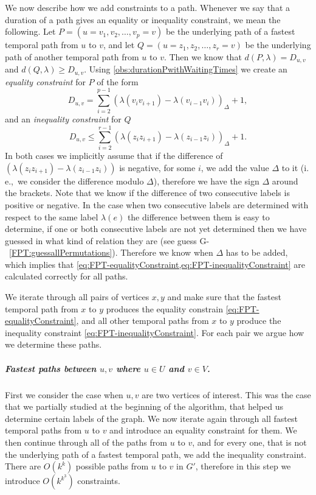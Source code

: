 \documentclass[a4paper,UKenglish,cleveref, autoref, thm-restate]{lipics-v2021}
\newcommand{\ie}{i.\,e.,\ }
\begin{document}
We now describe how we add constraints to a path. Whenever we say that a duration of a path gives an equality or inequality constraint, we mean the following.
Let $P=(u=v_1,v_2, \dots, v_p = v)$ be the underlying path of a fastest temporal path from $u$ to $v$,
and let $Q = (u=z_1,z_2, \dots, z_r = v)$ be the underlying path of another temporal path from $u$ to $v$.
Then we know that $d(P,\lambda) = D_{u,v}$ and $d(Q, \lambda) \geq D_{u,v}$.
Using \cref{obs:durationPwithWaitingTimes}
we create an \emph{equality constraint} for $P$
of the form 
\begin{equation}\label{eq:FPT-equalityConstraint}
    D_{u,v} = \sum _ {i=2} ^ {p-1} (\lambda (v_{i}v_{i+1}) - \lambda (v_{i-1}v_i))_\Delta + 1,
\end{equation}
and an \emph{inequality constraint} for $Q$ 
\begin{equation}\label{eq:FPT-inequalityConstraint}
    D_{u,v} \leq \sum _ {i=2} ^ {r-1} (\lambda (z_{i}z_{i+1}) - \lambda (z_{i-1}z_i))_\Delta + 1.
\end{equation}
In both cases we implicitly assume that if the difference of $(\lambda (z_{i}z_{i+1}) - \lambda (z_{i-1}z_i))$ is negative, for some $i$, we add the value $\Delta$ to it (\ie we consider the difference modulo $\Delta$), therefore we have the sign $\Delta$ around the brackets.
Note that we know if the difference of two consecutive labels is positive or negative. 
In the case when two consecutive labels are determined with respect to the same label $\lambda(e)$ the difference between them is easy to determine,
if one or both consecutive labels are not yet determined 
then we have guessed in what kind of relation they are (see guess G-~\ref{FPT:guessallPermutations}).
Therefore we know when $\Delta$ has to be added, which implies that \cref{eq:FPT-equalityConstraint,eq:FPT-inequalityConstraint} are calculated correctly for all paths.

We iterate through all pairs of vertices $x,y$ and make sure that the fastest temporal path from $x$ to $y$ produces the equality constrain \cref{eq:FPT-equalityConstraint},
and all other temporal paths from $x$ to $y$ produce the inequality constraint \cref{eq:FPT-inequalityConstraint}.
For each pair we argue how we determine these paths.

\subparagraph{\boldmath Fastest paths between $u,v$ where $u \in U$ and $v \in V$.}
First we consider the case when $u,v$ are two vertices of interest.
This was the case that we partially studied at the beginning of the algorithm, that helped us determine certain labels of the graph.
We now iterate again through all fastest temporal paths from $u$ to $v$ and introduce an equality constraint for them.
We then continue 
through all of the paths from $u$ to $v$, and for every one, that is not the underlying path of a fastest temporal path, we add the inequality constraint.
There are $O(k^k)$ possible paths from $u$ to $v$ in $G'$, therefore in this step we introduce $O(k^{k^3})$ constraints.
\end{document}
